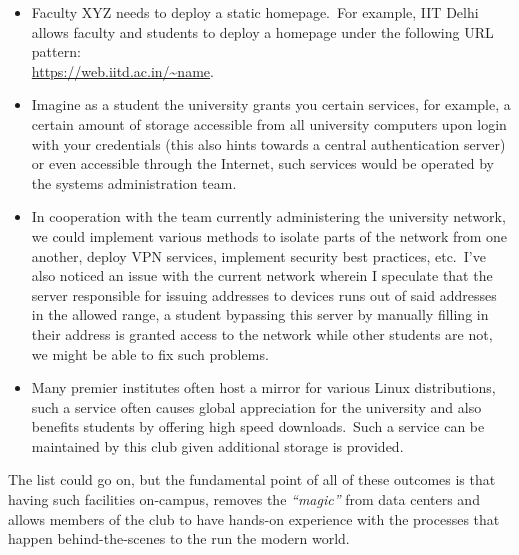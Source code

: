 \begin{itemize}
    \item Faculty XYZ needs to deploy a static homepage.\ For example, IIT Delhi allows faculty and students to deploy a
    homepage under the following URL pattern:\\
    \href{https://web.iitd.ac.in/~name}{\color{blue}\url{https://web.iitd.ac.in/~name}}.
    \item Imagine as a student the university grants you certain services, for example, a certain amount of storage
    accessible from all university computers upon login with your credentials (this also hints towards a central
    authentication server) or even accessible through the Internet, such services would be operated by the systems
    administration team.
    \item In cooperation with the team currently administering the university network, we could implement various
    methods to isolate parts of the network from one another, deploy VPN services, implement security best practices,
    etc.\ I've also noticed an issue with the current network wherein I speculate that the server responsible for
    issuing addresses to devices runs out of said addresses in the allowed range, a student bypassing this server by
    manually filling in their address is granted access to the network while other students are not, we might be able to
    fix such problems.
    \item Many premier institutes often host a mirror for various Linux distributions, such a service often causes
    global appreciation for the university and also benefits students by offering high speed downloads.\ Such a service
    can be maintained by this club given additional storage is provided.
\end{itemize}

The list could go on, but the fundamental point of all of these outcomes is that having such facilities on-campus,
removes the \emph{``magic''} from data centers and allows members of the club to have hands-on experience with the
processes that happen behind-the-scenes to the run the modern world.\\




